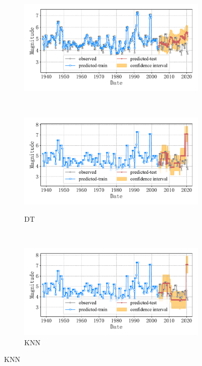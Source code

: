 \begin{figure}[!htbp]
\begin{subfigure}[b]{0.45\textwidth}
    \includegraphics[width=\textwidth]{Img/chap5_seism/block3/seism_gbr_minyear_1932_maxyear_2021_spanlat_2_spanlon_4_timewindow_72_nextmonth_12_minmag_3.0_block_3.pdf}
    \vspace{-1cm}
    \label{fig:seism_gbr_minyear_1932_maxyear_2021_spanlat_2_spanlon_4_timewindow_72_nextmonth_12_minmag_3.0_block_3}
  \end{subfigure}
  ~
  \begin{subfigure}[b]{0.45\textwidth}
    \caption{DT}
    \vspace{-0.2cm}
    \includegraphics[width=\textwidth]{Img/chap5_seism/block3/seism_dt_minyear_1932_maxyear_2021_spanlat_2_spanlon_4_timewindow_72_nextmonth_12_minmag_3.0_block_3.pdf}
    \vspace{-1cm}
    \label{fig:seism_dt_minyear_1932_maxyear_2021_spanlat_2_spanlon_4_timewindow_72_nextmonth_12_minmag_3.0_block_3}
  \end{subfigure}
  \\
  \begin{subfigure}[b]{0.45\textwidth}
    \caption{KNN}
    \vspace{-0.2cm}
    \includegraphics[width=\textwidth]{Img/chap5_seism/block3/seism_kn_minyear_1932_maxyear_2021_spanlat_2_spanlon_4_timewindow_72_nextmonth_12_minmag_3.0_block_3.pdf}

\end{subfigure}
\end{figure}
